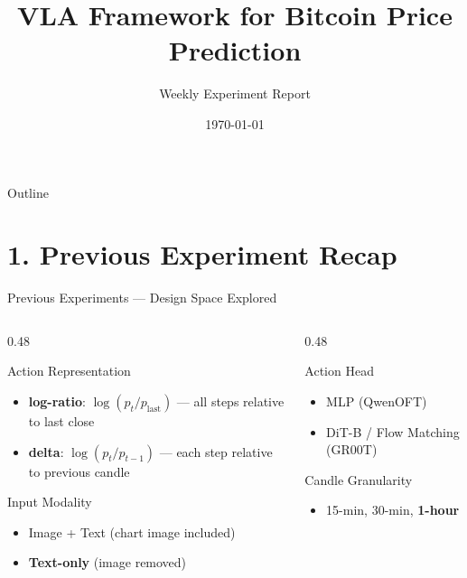 \documentclass[aspectratio=169,11pt]{beamer}
\title[VLA-Finance]{VLA Framework for Bitcoin Price Prediction}
\subtitle{Weekly Experiment Report}
\author{}
\date{\today}
\begin{document}

\begin{frame}
  \titlepage
\end{frame}

\begin{frame}{Outline}
  \tableofcontents
\end{frame}

\section{1. Previous Experiment Recap}

\begin{frame}{Previous Experiments --- Design Space Explored}
  \begin{columns}
    \begin{column}{0.48\textwidth}
      \begin{block}{Action Representation}
        \begin{itemize}
          \item \textbf{log-ratio}: $\log(p_t / p_{\text{last}})$ --- all steps relative to last close
          \item \textbf{delta}: $\log(p_t / p_{t-1})$ --- each step relative to previous candle
        \end{itemize}
      \end{block}
      \begin{block}{Input Modality}
        \begin{itemize}
          \item Image + Text (chart image included)
          \item \textbf{Text-only} (image removed)
        \end{itemize}
      \end{block}
    \end{column}
    \begin{column}{0.48\textwidth}
      \begin{block}{Action Head}
        \begin{itemize}
          \item MLP (QwenOFT)
          \item DiT-B / Flow Matching (GR00T)
        \end{itemize}
      \end{block}
      \begin{block}{Candle Granularity}
        \begin{itemize}
          \item 15-min, 30-min, \textbf{1-hour}
        \end{itemize}
      \end{block}
    \end{column}
  \end{columns}


\end{frame}
\end{document}
